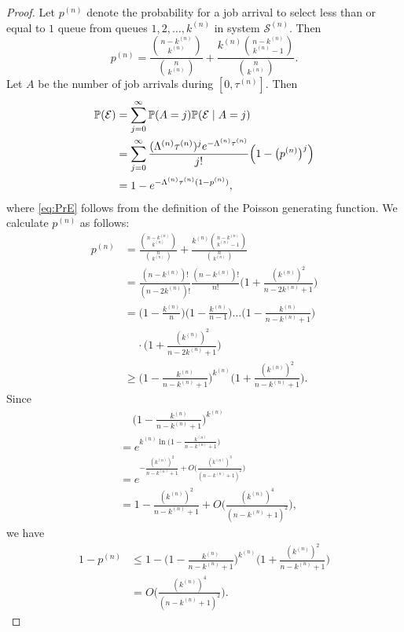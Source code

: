 \documentclass[sigconf]{acmart}
\renewcommand{\Pr}{\mathbb{P}} %
\newcommand{\supn}{^{(n)}}
\begin{document}
\begin{proof}
Let $p\supn$ denote the probability for a job arrival to select less than or equal to $1$ queue from queues $1,2,\dots,k\supn$ in system $\mathcal{S}\supn$. Then
\begin{equation*}
p\supn=\frac{\binom{n-k\supn}{k\supn}}{\binom{n}{k\supn}}+\frac{k\supn\binom{n-k\supn}{k\supn-1}}{\binom{n}{k\supn}}.
\end{equation*}
Let $A$ be the number of job arrivals during $[0,\tau\supn]$. Then
\begin{align}
\Pr(\mathcal{E})
&=\sum_{j=0}^{\infty}\Pr(A=j)\Pr(\mathcal{E}\mid A=j)\nonumber\\
&=\sum_{j=0}^{\infty}\frac{(\Lambda\supn\tau\supn
)^je^{-\Lambda\supn\tau\supn}}{j!}\Bigl(1-\bigl(p\supn\bigr)^j\Bigr)\nonumber\\
&=1-e^{-\Lambda\supn\tau\supn(1-p\supn)},\label{eq:PrE}
\end{align}
where \eqref{eq:PrE} follows from the definition of the Poisson generating function.  We calculate $p\supn$ as follows:
\begin{align*}
p\supn&=\frac{\binom{n-k\supn}{k\supn}}{\binom{n}{k\supn}}+\frac{k\supn\binom{n-k\supn}{k\supn-1}}{\binom{n}{k\supn}}\\
&=\frac{(n-k\supn)!}{(n-2k\supn)!}\frac{(n-k\supn)!}{n!}\biggl(1+\frac{(k\supn)^2}{n-2k\supn+1}\biggr)\\
&=\biggl(1-\frac{k\supn}{n}\biggr)\biggl(1-\frac{k\supn}{n-1}\biggr)\dots\biggl(1-\frac{k\supn}{n-k\supn+1}\biggr)\\
&\mspace{21mu}\cdot\biggl(1+\frac{(k\supn)^2}{n-2k\supn+1}\biggr)\\
&\ge \biggl(1-\frac{k\supn}{n-k\supn+1}\biggr)^{k\supn}\biggl(1+\frac{(k\supn)^2}{n-k\supn+1}\biggr).
\end{align*}
Since
\begin{align*}
&\mspace{21mu}\biggl(1-\frac{k\supn}{n-k\supn+1}\biggr)^{k\supn}\\
&=e^{k\supn\ln\bigl(1-\frac{k\supn}{n-k\supn+1}\bigr)}\\
&=e^{-\frac{(k\supn)^2}{n-k\supn+1}+O\bigl(\frac{(k\supn)^3}{(n-k\supn+1)^2}\bigr)}\\
&=1-\frac{(k\supn)^2}{n-k\supn+1}+O\biggl(\frac{(k\supn)^4}{(n-k\supn+1)^2}\biggr),
\end{align*}
we have
\begin{align*}
1-p\supn&\le 1-\biggl(1-\frac{k\supn}{n-k\supn+1}\biggr)^{k\supn}\biggl(1+\frac{(k\supn)^2}{n-k\supn+1}\biggr)\\
&=O\biggl(\frac{(k\supn)^4}{(n-k\supn+1)^2}\biggr).

\end{align*}
\end{proof}
\end{document}

